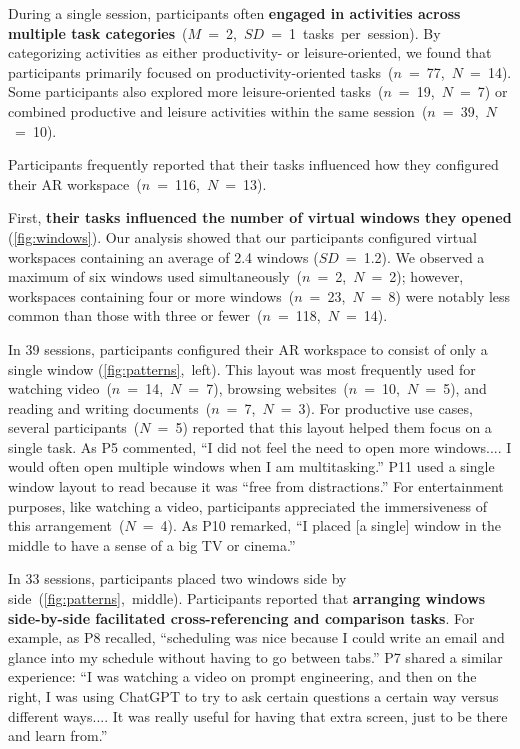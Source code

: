 During a single session, participants often \textbf{engaged in activities across multiple task categories}~($M$~=~2,~$SD$~=~1~tasks~per~session). 
By categorizing activities as either productivity- or leisure-oriented, we found that participants primarily focused on productivity-oriented tasks~($n$~=~77,~$N$~=~14).
Some participants also explored more leisure-oriented tasks~($n$~=~19,~$N$~=~7)
or combined productive and leisure activities within the same session~($n$~=~39,~$N$~=~10).

Participants frequently reported that their tasks influenced how they configured their AR workspace~($n$~=~116,~$N$~=~13).

First, \textbf{their tasks influenced the number of virtual windows they opened} (\autoref{fig:windows}).
Our analysis showed that our participants configured virtual workspaces containing an average of 2.4 windows ($SD$~=~1.2).
We observed a maximum of six windows used simultaneously~($n$~=~2,~$N$~=~2);
however, workspaces containing four or more windows~($n$~=~23,~$N$~=~8)
were notably less common than those with three or fewer~($n$~=~118,~$N$~=~14).

In 39 sessions, participants configured their AR workspace to consist of only a single window (\autoref{fig:patterns},~left).
This layout was most frequently used for watching video~($n$~=~14,~$N$~=~7), browsing websites~($n$~=~10,~$N$~=~5), and reading and writing documents~($n$~=~7,~$N$~=~3).
For productive use cases, 
several participants~($N$~=~5) reported that this layout helped them focus on a single task.
As P5 commented, ``I did not feel the need to open more windows.... I would often open multiple windows when I am multitasking.''
P11 used a single window layout to read because it was ``free from distractions.''
For entertainment purposes, like watching a video, participants appreciated the immersiveness of this arrangement~($N$~=~4).
As P10 remarked, ``I placed [a single] window in the middle to have a sense of a big TV or cinema.''


In 33 sessions, 
participants placed two windows side by side~(\autoref{fig:patterns},~middle). 
Participants reported that \textbf{arranging windows side-by-side facilitated cross-referencing and comparison tasks}.
For example, as P8 recalled, 
``scheduling was nice because I could write an email and glance into my schedule without having to go between tabs.''
P7 shared a similar experience: ``I was watching a video on prompt engineering, and then on the right, I was using ChatGPT to try to ask certain questions a certain way versus different ways.... It was really useful for having that extra screen, just to be there and learn from.''

